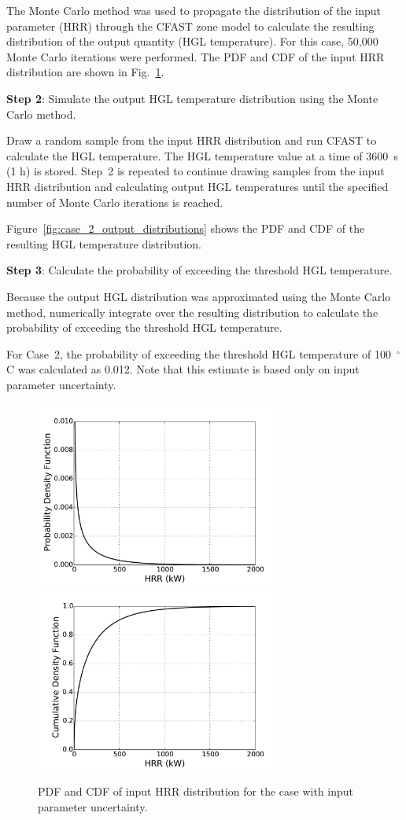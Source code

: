 \documentclass[12pt]{article}
\begin{document}
The Monte Carlo method was used to propagate the distribution of the input parameter (HRR) through the CFAST zone model to calculate the resulting distribution of the output quantity (HGL temperature). For this case, 50,000 Monte Carlo iterations were performed. The PDF and CDF of the input HRR distribution are shown in Fig.~\ref{fig:case_2_input_distributions}.

\textbf{Step 2}: Simulate the output HGL temperature distribution using the Monte Carlo method.

Draw a random sample from the input HRR distribution and run CFAST to calculate the HGL temperature. The HGL temperature value at a time of 3600~s (1 h) is stored. Step~2 is repeated to continue drawing samples from the input HRR distribution and calculating output HGL temperatures until the specified number of Monte Carlo iterations is reached.

Figure~\ref{fig:case_2_output_distributions} shows the PDF and CDF of the resulting HGL temperature distribution.

\textbf{Step 3}: Calculate the probability of exceeding the threshold HGL temperature.

Because the output HGL distribution was approximated using the Monte Carlo method, numerically integrate over the resulting distribution to calculate the probability of exceeding the threshold HGL temperature.

For Case~2, the probability of exceeding the threshold HGL temperature of 100~$^\circ$C was calculated as 0.012. Note that this estimate is based only on input parameter uncertainty.

\clearpage


\begin{figure}[p]
\includegraphics[width=3.2in]{Figures/input_PDF}
\includegraphics[width=3.2in]{Figures/input_CDF}
\caption{PDF and CDF of input HRR distribution for the case with input parameter uncertainty.}
\label{fig:case_2_input_distributions}
\end{figure}
\end{document}
